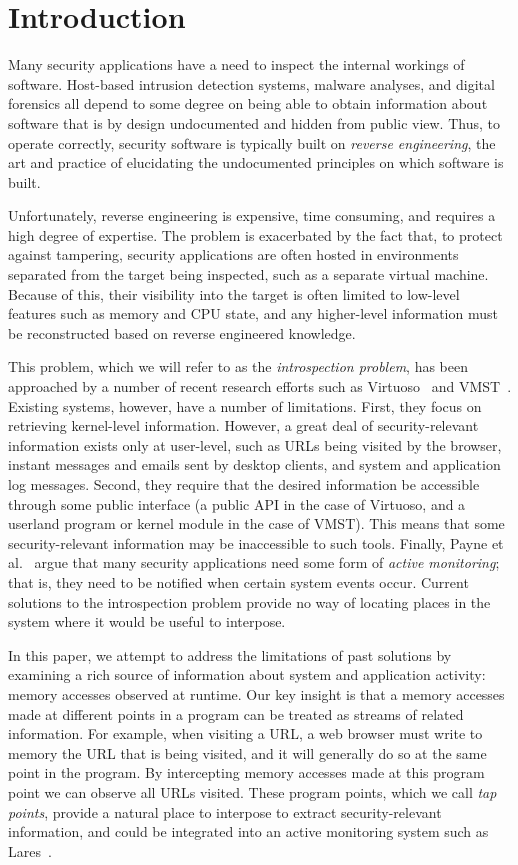 \section{Introduction}
\label{sec:introduction}

Many security applications have a need to inspect the internal workings
of software. Host-based intrusion detection systems, malware analyses, and
digital forensics all depend to some degree on being able to obtain
information about software that is by design undocumented and hidden
from public view. Thus, to operate correctly, security software is
typically built on \emph{reverse engineering}, the art and practice of
elucidating the undocumented principles on which software is built.

Unfortunately, reverse engineering is expensive, time consuming, and
requires a high degree of expertise. The problem is exacerbated by the
fact that, to protect against tampering, security applications are often
hosted in environments separated from the target being inspected, such
as a separate virtual machine. Because of this, their visibility into
the target is often limited to low-level features such as memory and CPU
state, and any higher-level information must be reconstructed based on
reverse engineered knowledge.

This problem, which we will refer to as the \emph{introspection
problem}, has been approached by a number of recent research efforts
such as Virtuoso~\cite{Dolan-Gavitt:2011uq} and VMST~\cite{Fu:2012fk}.
Existing systems, however, have a number of limitations. First, they
focus on retrieving kernel-level information. However, a great deal of
security-relevant information exists only at user-level, such as URLs
being visited by the browser, instant messages and emails sent by
desktop clients, and system and application log messages. Second,
they require that the desired information be accessible through some
public interface (a public API in the case of Virtuoso, and a userland
program or kernel module in the case of VMST). This means that some
security-relevant information may be inaccessible to such tools.
Finally, Payne et al.~\cite{payne:2008} argue that many security
applications need some form of \emph{active monitoring}; that is, they
need to be notified when certain system events occur. Current solutions
to the introspection problem provide no way of locating places in the
system where it would be useful to interpose.

In this paper, we attempt to address the limitations of past solutions
by examining a rich source of information about system and application
activity: memory accesses observed at runtime. Our key insight is that a
memory accesses made at different points in a program can be treated as
streams of related information. For example, when visiting a URL, a web
browser must write to memory the URL that is being visited, and it will
generally do so at the same point in the program. By intercepting memory
accesses made at this program point we can observe all URLs visited. These
program points, which we call \emph{tap points}, provide a natural place
to interpose to extract security-relevant information, and could be
integrated into an active monitoring system such as
Lares~\cite{payne:2008}.

